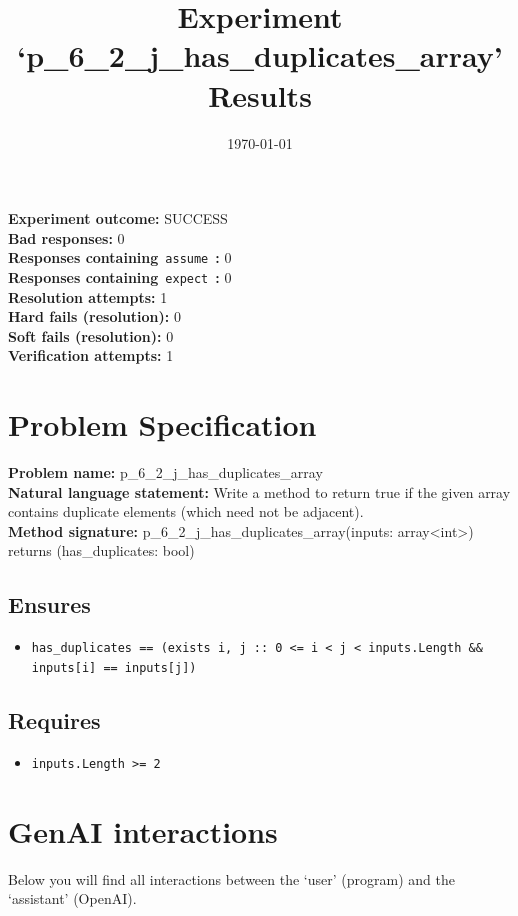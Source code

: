 \documentclass{article}
\begin{document}
\title{Experiment `p\_6\_2\_j\_has\_duplicates\_array' Results}
\author{\today}
\date{}
\maketitle
\textbf{Experiment outcome: }SUCCESS
\\\textbf{Bad responses: }0
\\\textbf{Responses containing}~\texttt{assume}~\textbf{: }0
\\\textbf{Responses containing}~\texttt{expect}~\textbf{: }0
\\\textbf{Resolution attempts: }1
\\\textbf{Hard fails (resolution): }0
\\\textbf{Soft fails (resolution): }0
\\\textbf{Verification attempts: }1
\section*{Problem Specification}
\textbf{Problem name: }p\_6\_2\_j\_has\_duplicates\_array
\\\textbf{Natural language statement: }Write a method to return true if the given array contains duplicate elements (which need not be adjacent).
\\\textbf{Method signature: }p\_6\_2\_j\_has\_duplicates\_array(inputs: array<int>) returns (has\_duplicates: bool)
\subsection*{Ensures}
\begin{itemize}
\item \texttt{has\_duplicates == (exists i, j :: 0 <= i < j < inputs.Length \&\& inputs[i] == inputs[j])}
\end{itemize}
\subsection*{Requires}
\begin{itemize}
\item \texttt{inputs.Length >= 2}
\end{itemize}
\clearpage
\section*{GenAI interactions}
Below you will find all interactions between the `user' (program) and the `assistant' (OpenAI).
\end{document}
